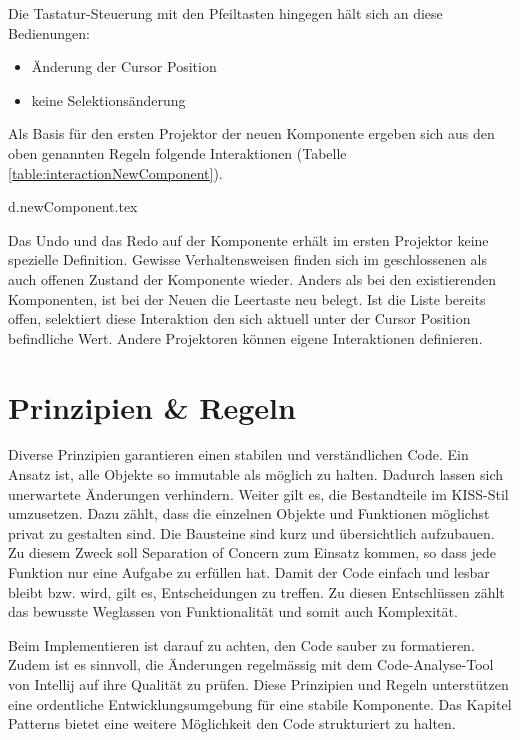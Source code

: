 \noindent
Die Tastatur-Steuerung mit den Pfeiltasten hingegen hält sich an diese Bedienungen:

\begin{itemize}
    \item Änderung der Cursor Position
    \item keine Selektionsänderung
\end{itemize}

\noindent
Als Basis für den ersten Projektor der neuen Komponente ergeben sich aus den oben genannten Regeln folgende Interaktionen (Tabelle \ref{table:interactionNewComponent}).

\clearpage
{d.newComponent.tex}

Das Undo und das Redo auf der Komponente erhält im ersten Projektor keine spezielle Definition.
Gewisse Verhaltensweisen finden sich im geschlossenen als auch offenen Zustand der Komponente wieder.
Anders als bei den existierenden Komponenten, ist bei der Neuen die Leertaste neu belegt. 
Ist die Liste bereits offen, selektiert diese Interaktion den sich aktuell unter der Cursor Position befindliche Wert.
Andere Projektoren können eigene Interaktionen definieren.


\section{Prinzipien \& Regeln}
\label{sec:principleRules}

Diverse Prinzipien garantieren einen stabilen und verständlichen Code.
Ein Ansatz ist, alle Objekte so immutable als möglich zu halten.
Dadurch lassen sich unerwartete Änderungen verhindern.
Weiter gilt es, die Bestandteile im KISS-Stil umzusetzen.
Dazu zählt, dass die einzelnen Objekte und Funktionen möglichst privat zu gestalten sind.
Die Bausteine sind kurz und übersichtlich aufzubauen.
Zu diesem Zweck soll Separation of Concern zum Einsatz kommen, so dass jede Funktion nur eine Aufgabe zu erfüllen hat.
Damit der Code einfach und lesbar bleibt bzw. wird, gilt es, Entscheidungen zu treffen.
Zu diesen Entschlüssen zählt das bewusste Weglassen von Funktionalität und somit auch Komplexität.

Beim Implementieren ist darauf zu achten, den Code sauber zu formatieren.
Zudem ist es sinnvoll, die Änderungen regelmässig mit dem Code-Analyse-Tool von Intellij auf ihre Qualität zu prüfen. 
Diese Prinzipien und Regeln unterstützen eine ordentliche Entwicklungsumgebung für eine stabile Komponente.
Das Kapitel Patterns bietet eine weitere Möglichkeit den Code strukturiert zu halten.


